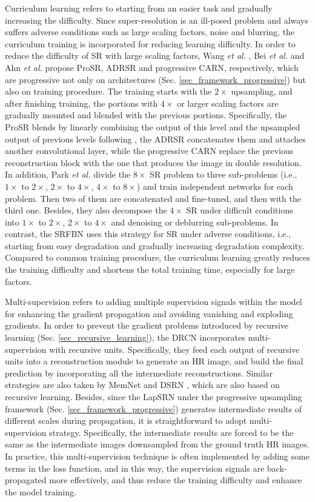 {\label{sec_curriculum_learning}
Curriculum learning  refers to starting from an easier task and gradually increasing the difficulty.
Since super-resolution is an ill-posed problem and always suffers adverse conditions such as large scaling factors, noise and blurring, the curriculum training is incorporated for reducing learning difficulty.
In order to reduce the difficulty of SR with large scaling factors, Wang \textit{et al.} , Bei \textit{et al.}  and Ahn \textit{et al.}  propose ProSR, ADRSR and progressive CARN, respectively, which are progressive not only on architectures (Sec. \ref{sec_framework_progressive}) but also on training procedure.
The training starts with the $2\times$ upsampling, and after finishing training, the portions with $4\times$ or larger scaling factors are gradually mounted and blended with the previous portions.
Specifically, the ProSR blends by linearly combining the output of this level and the upsampled output of previous levels following , the ADRSR concatenates them and attaches another convolutional layer, while the progressive CARN replace the previous reconstruction block with the one that produces the image in double resolution.
In addition, Park \textit{et al.}  divide the $8\times$ SR problem to three sub-problems (i.e., $1\times$ to $2\times$, $2\times$ to $4\times$, $4\times$ to $8\times$) and train independent networks for each problem.
Then two of them are concatenated and fine-tuned, and then with the third one.
Besides, they also decompose the $4\times$ SR under difficult conditions into $1\times$ to $2\times$, $2\times$ to $4\times$ and denoising or deblurring sub-problems.
In contrast, the SRFBN  uses this strategy for SR under adverse conditions, i.e., starting from easy degradation and gradually increasing degradation complexity.
Compared to common training procedure, the curriculum learning greatly reduces the training difficulty and shortens the total training time, especially for large factors.

\label{sec_multi_supervision}
Multi-supervision refers to adding multiple supervision signals within the model for enhancing the gradient propagation and avoiding vanishing and exploding gradients.
In order to prevent the gradient problems introduced by recursive learning (Sec. \ref{sec_recursive_learning}), the DRCN  incorporates multi-supervision with recursive units.
Specifically, they feed each output of recursive units into a reconstruction module to generate an HR image, and build the final prediction by incorporating all the intermediate reconstructions.  
Similar strategies are also taken by MemNet  and DSRN , which are also based on recursive learning.
Besides, since the LapSRN  under the progressive upsampling framework (Sec. \ref{sec_framework_progressive}) generates intermediate results of different scales during propagation, it is straightforward to adopt multi-supervision strategy.
Specifically, the intermediate results are forced to be the same as the intermediate images downsampled from the ground truth HR images.
In practice, this multi-supervision technique is often implemented by adding some terms in the loss function, and in this way, the supervision signals are back-propagated more effectively, and thus reduce the training difficulty and enhance the model training.

}
